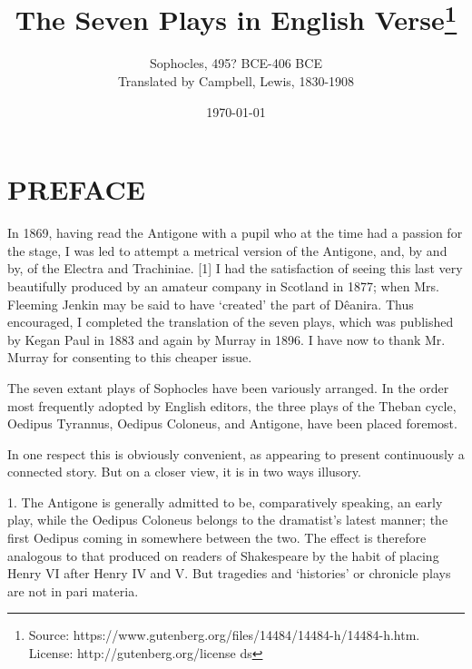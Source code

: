 \documentclass[11pt,letter]{book}
\begin{document}
\title{The Seven Plays in English Verse\thanks{Source: https://www.gutenberg.org/files/14484/14484-h/14484-h.htm. License: http://gutenberg.org/license ds}}
\date{\today}
\author{Sophocles, 495? BCE-406 BCE\\ Translated by Campbell, Lewis, 1830-1908}
\maketitle

\setcounter{tocdepth}{1}
\tableofcontents
\renewcommand{\baselinestretch}{1.0}
\normalsize

\section{PREFACE}
\par  In 1869, having read the Antigone with a pupil who at the time had a passion for the stage, I was led to attempt a metrical version of the Antigone, and, by and by, of the Electra and Trachiniae. [1] I had the satisfaction of seeing this last very beautifully produced by an amateur company in Scotland in 1877; when Mrs. Fleeming Jenkin may be said to have ‘created’ the part of Dêanira. Thus encouraged, I completed the translation of the seven plays, which was published by Kegan Paul in 1883 and again by Murray in 1896. I have now to thank Mr. Murray for consenting to this cheaper issue.

\par  The seven extant plays of Sophocles have been variously arranged. In the order most frequently adopted by English editors, the three plays of the Theban cycle, Oedipus Tyrannus, Oedipus Coloneus, and Antigone, have been placed foremost.

\par  In one respect this is obviously convenient, as appearing to present continuously a connected story. But on a closer view, it is in two ways illusory.

\par  1. The Antigone is generally admitted to be, comparatively speaking, an early play, while the Oedipus Coloneus belongs to the dramatist’s latest manner; the first Oedipus coming in somewhere between the two. The effect is therefore analogous to that produced on readers of Shakespeare by the habit of placing Henry VI after Henry IV and V. But tragedies and ‘histories’ or chronicle plays are not in pari materia.
\end{document}
